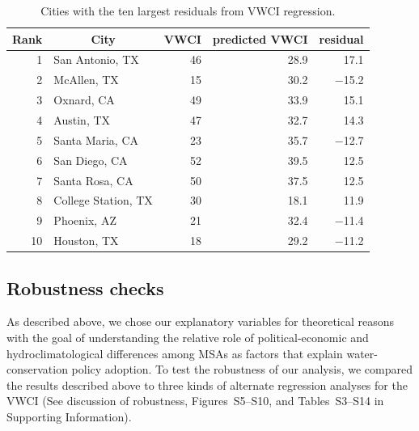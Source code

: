 \documentclass[draft,linenumbers]{agujournal}\usepackage{knitr}
\begin{document}
%
%
\begin{table}[tbp]
\centering
\caption{Cities with the ten largest residuals from VWCI regression.} 
\label{tab:vwci_top_residuals}
\begin{tabular}{rlrrr}
  \hline
\multicolumn{1}{c}{ Rank } & \multicolumn{1}{c}{ City } & \multicolumn{1}{c}{ VWCI } & \multicolumn{1}{c}{ predicted VWCI } & \multicolumn{1}{c}{ residual } \\ 
  \hline
 1 & San Antonio, TX & 46 & 28.9 & 17.1 \\ 
   2 & McAllen, TX & 15 & 30.2 & $-$15.2 \\ 
   3 & Oxnard, CA & 49 & 33.9 & 15.1 \\ 
   4 & Austin, TX & 47 & 32.7 & 14.3 \\ 
   5 & Santa Maria, CA & 23 & 35.7 & $-$12.7 \\ 
   6 & San Diego, CA & 52 & 39.5 & 12.5 \\ 
   7 & Santa Rosa, CA & 50 & 37.5 & 12.5 \\ 
   8 & College Station, TX & 30 & 18.1 & 11.9 \\ 
   9 & Phoenix, AZ & 21 & 32.4 & $-$11.4 \\ 
  10 & Houston, TX & 18 & 29.2 & $-$11.2 \\ 
   \hline
\end{tabular}
\end{table}



\subsection{Robustness checks}
As described above, we chose our explanatory variables
for theoretical reasons with the goal of understanding the relative role of political-economic
and hydroclimatological differences among MSAs as factors that explain water-conservation policy
adoption.
To test the robustness of our analysis,
we compared the results described above to three kinds of alternate regression
analyses for the VWCI
(See discussion of robustness, Figures~S5--S10, and Tables~S3--S14
in Supporting Information).
%
\end{document}
